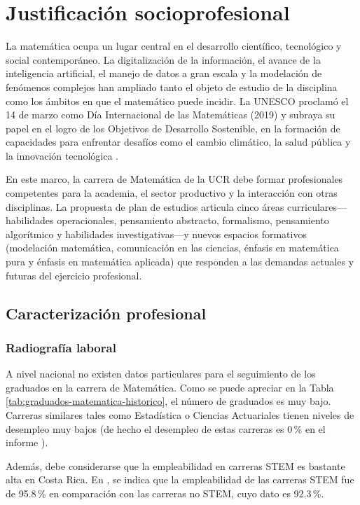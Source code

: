 

\section{Justificación socioprofesional}

La matemática ocupa un lugar central en el desarrollo científico, tecnológico y social contemporáneo. La digitalización de la información, el avance de la inteligencia artificial, el manejo de datos a gran escala y la modelación de fenómenos complejos han ampliado tanto el objeto de estudio de la disciplina como los ámbitos en que el matemático puede incidir. La UNESCO proclamó el 14 de marzo como Día Internacional de las Matemáticas (2019) y subraya su papel en el logro de los Objetivos de Desarrollo Sostenible, en la formación de capacidades para enfrentar desafíos como el cambio climático, la salud pública y la innovación tecnológica \cite{UNESCO2020IDM}.

En este marco, la carrera de Matemática de la UCR debe formar profesionales competentes para la academia, el sector productivo y la interacción con otras disciplinas. La propuesta de plan de estudios articula cinco áreas curriculares---habilidades operacionales, pensamiento abstracto, formalismo, pensamiento algorítmico y habilidades investigativas---y nuevos espacios formativos (modelación matemática, comunicación en las ciencias, énfasis en matemática pura y énfasis en matemática aplicada) que responden a las demandas actuales y futuras del ejercicio profesional.


\subsection{Caracterización profesional}


\subsubsection{Radiografía laboral}

A nivel nacional no existen datos particulares para el seguimiento de los graduados en la carrera de Matemática. Como se puede apreciar en la Tabla \ref{tab:graduados-matematica-historico}, el número de graduados es muy bajo. Carreras similares tales como Estadística o Ciencias Actuariales tienen niveles de desempleo muy bajos (de hecho el desempleo de estas carreras es 0\,\% en el informe \cite{conare25}).

Además, debe considerarse que la empleabilidad en carreras STEM es bastante alta en Costa Rica. En \cite{ucr23}, se indica que la empleabilidad de las carreras STEM fue de 95.8\,\% en comparación con las carreras no STEM, cuyo dato es 92.3\,\%.


